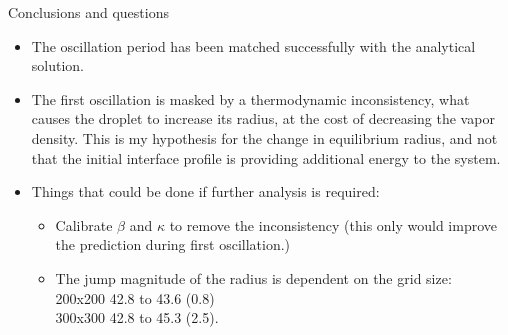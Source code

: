 \documentclass{beamer}
\begin{document}
	\begin{frame}{Conclusions and questions}
		
		\begin{itemize}
			\item<1> The oscillation period has been matched successfully with the analytical solution.
			\item<1> The first oscillation is masked by a thermodynamic inconsistency, what causes the droplet to increase its radius, at the cost of decreasing the vapor density. This is my hypothesis for the change in equilibrium radius, and not that the initial interface profile is providing additional energy to the system.
			\item<2-> Things that could be done if further analysis is required:
			\begin{itemize}
				\item Calibrate $\beta$ and $\kappa$ to remove the inconsistency (this only would improve the prediction during first oscillation.)
				\item The jump magnitude of the radius is dependent on the grid size:\\
				 200x200 42.8 to 43.6 (0.8)\\
				 300x300 42.8 to 45.3 (2.5).
			\end{itemize}
		\end{itemize}
	\end{frame}
	
\end{document}
